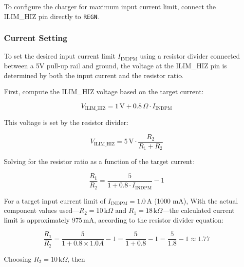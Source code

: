\documentclass[12pt]{article}
\begin{document}
To configure the charger for maximum input current limit, connect the ILIM\_HIZ pin directly to \texttt{REGN}.

\subsubsection{Current Setting}
To set the desired input current limit \( I_{\text{INDPM}} \) using a resistor divider connected between a 5V pull-up rail and ground, the voltage at the ILIM\_HIZ pin is determined by both the input current and the resistor ratio.

First, compute the ILIM\_HIZ voltage based on the target current:

\begin{equation}
    V_{\text{ILIM\_HIZ}} = 1\,\text{V} + 0.8\,\Omega \cdot I_{\text{INDPM}}
    \label{equ:ILIM_HIZ_voltage_2}
\end{equation}

This voltage is set by the resistor divider:

\begin{equation}
    V_{\text{ILIM\_HIZ}} = 5\,\text{V} \cdot \frac{R_2}{R_1 + R_2}
    \label{equ:divider_voltage}
\end{equation}

Solving for the resistor ratio as a function of the target current:

\begin{equation}
    \frac{R_1}{R_2} = \frac{5}{1 + 0.8 \cdot I_{\text{INDPM}}} - 1
    \label{equ:resistor_ratio}
\end{equation}

For a target input current limit of \( I_{\text{INDPM}} = 1.0\,\text{A} \) (1000 mA),
With the actual component values used—\( R_2 = 10\,\text{k}\Omega \) and \( R_1 = 18\,\text{k}\Omega \)—the calculated current limit is approximately 975\,mA, according to the resistor divider equation:

\begin{equation}
    \frac{R_1}{R_2} = \frac{5}{1 + 0.8 \times 1.0A}- 1 
    = \frac{5}{1 + 0.8} - 1 = \frac{5}{1.8} - 1 \approx 1.77
    \label{equ:resistor_ratio_example}
\end{equation}

Choosing \( R_2 = 10\,\text{k}\Omega \), then
\end{document}
